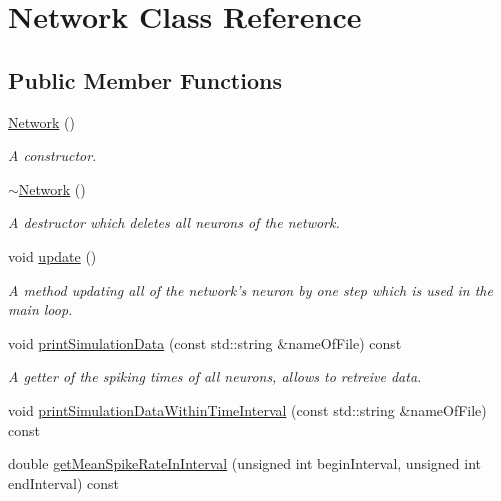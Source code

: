 \hypertarget{classNetwork}{\section{Network Class Reference}
\label{classNetwork}
}
\subsection*{Public Member Functions}
\begin{DoxyCompactItemize}
\item 
\hyperlink{classNetwork_a3cc2fb4f8fa4d507077e8da85ce5a1c8}{Network} ()
\begin{DoxyCompactList}\small\item\em A constructor. \end{DoxyCompactList}\item 
\hypertarget{classNetwork_a7a4e19cdb4bf0c7ecf82baa643831492}{\hyperlink{classNetwork_a7a4e19cdb4bf0c7ecf82baa643831492}{$\sim$\-Network} ()}\label{classNetwork_a7a4e19cdb4bf0c7ecf82baa643831492}

\begin{DoxyCompactList}\small\item\em A destructor which deletes all neurons of the network. \end{DoxyCompactList}\item 
\hypertarget{classNetwork_ab07bb6f6d9020b9eb230551083ea929f}{void \hyperlink{classNetwork_ab07bb6f6d9020b9eb230551083ea929f}{update} ()}\label{classNetwork_ab07bb6f6d9020b9eb230551083ea929f}

\begin{DoxyCompactList}\small\item\em A method updating all of the network's neuron by one step which is used in the main loop. \end{DoxyCompactList}\item 
void \hyperlink{classNetwork_a222e084554183af355833cda07a83877}{print\-Simulation\-Data} (const std\-::string \&name\-Of\-File) const 
\begin{DoxyCompactList}\small\item\em A getter of the spiking times of all neurons, allows to retreive data. \end{DoxyCompactList}\item 
void \hyperlink{classNetwork_a8909c07d0e6e292f5ca54e56a797ebe0}{print\-Simulation\-Data\-Within\-Time\-Interval} (const std\-::string \&name\-Of\-File) const 
\item 
double \hyperlink{classNetwork_ac82435bb56bf5eabfdd3e3f4afadea2b}{get\-Mean\-Spike\-Rate\-In\-Interval} (unsigned int begin\-Interval, unsigned int end\-Interval) const 
\end{DoxyCompactItemize}
